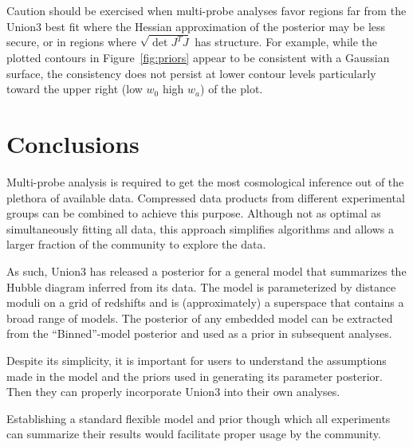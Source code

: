 \documentclass[11pt,a4paper]{article}
\begin{document}
Caution should be exercised when multi-probe analyses favor regions far from the Union3 best fit  where the Hessian approximation of the
posterior may be less secure, or in regions where $\sqrt{\det{J^TJ}}$ has structure.  For example, while the plotted contours in Figure~\ref{fig:priors}
appear to be consistent with a Gaussian surface, the consistency does not persist at lower contour levels particularly toward the upper right (low $w_0$ high $w_a$) of the plot.

\section{Conclusions}
Multi-probe  analysis is required to get the most cosmological inference out of the plethora of available data. 
Compressed data products from different experimental groups can be combined to achieve this purpose.
Although not as optimal as simultaneously fitting all data, this approach simplifies algorithms and allows a larger
fraction of
the community to explore the data.

As such, Union3 has released a posterior for a general model that summarizes the Hubble diagram inferred from its data.
The model is parameterized by distance moduli on a grid of redshifts and is (approximately) a superspace that
contains a broad range of models.     The posterior of any embedded model can be
extracted from the  ``Binned''-model posterior and used as a prior in subsequent analyses.

Despite its simplicity, it is important for users to understand the assumptions made in the model and the priors used
in generating its parameter posterior.  Then they can properly incorporate Union3 into their own analyses.

Establishing a standard flexible model and prior though which all experiments can 
summarize their results would facilitate proper usage by the community.




\end{document}
